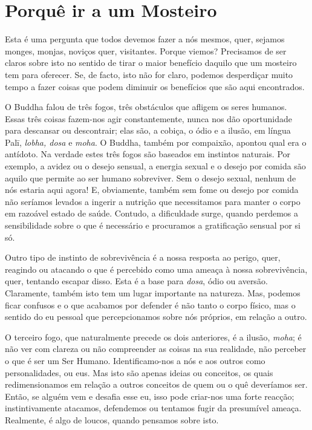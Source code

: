 \chapter{Porquê ir a um Mosteiro}

Esta é uma pergunta que todos devemos fazer a nós mesmos, quer, sejamos
monges, monjas, noviços quer, visitantes. Porque viemos? Precisamos de
ser claros sobre isto no sentido de tirar o maior benefício daquilo que
um mosteiro tem para oferecer. Se, de facto, isto não for claro, podemos
desperdiçar muito tempo a fazer coisas que podem diminuir os benefícios
que são aqui encontrados.

O Buddha falou de três fogos, três obstáculos que afligem os seres
humanos. Essas três coisas fazem-nos agir constantemente, nunca nos dão
oportunidade para descansar ou descontrair; elas são, a cobiça, o ódio e
a ilusão, em língua Palī, \emph{lobha, dosa} e \emph{moha}. O Buddha,
também por compaixão, apontou qual era o antídoto. Na verdade estes três
fogos são baseados em instintos naturais. Por exemplo, a avidez ou o
desejo sensual, a energia sexual e o desejo por comida são aquilo que
permite ao ser humano sobreviver. Sem o desejo sexual, nenhum de nós
estaria aqui agora! E, obviamente, também sem fome ou desejo por comida
não seríamos levados a ingerir a nutrição que necessitamos para manter o
corpo em razoável estado de saúde. Contudo, a dificuldade surge, quando
perdemos a sensibilidade sobre o que é necessário e procuramos a
gratificação sensual por si só.

Outro tipo de instinto de sobrevivência é a nossa resposta ao perigo,
quer, reagindo ou atacando o que é percebido como uma ameaça à nossa
sobrevivência, quer, tentando escapar disso. Esta é a base para
\emph{dosa}, ódio ou aversão. Claramente, também isto tem um lugar
importante na natureza. Mas, podemos ficar confusos e o que acabamos por
defender é não tanto o corpo físico, mas o sentido do eu pessoal que
percepcionamos sobre nós próprios, em relação a outro.

O terceiro fogo, que naturalmente precede os dois anteriores, é a
ilusão, \emph{moha}; é não ver com clareza ou não compreender as coisas
na sua realidade, não perceber o que é ser um Ser Humano.
Identificamo-nos a nós e aos outros como personalidades, ou eus. Mas
isto são apenas ideias ou conceitos, os quais redimensionamos em relação
a outros conceitos de quem ou o quê deveríamos ser. Então, se alguém vem
e desafia esse eu, isso pode criar-nos uma forte reacção;
instintivamente atacamos, defendemos ou tentamos fugir da presumível
ameaça. Realmente, é algo de loucos, quando pensamos sobre isto.

